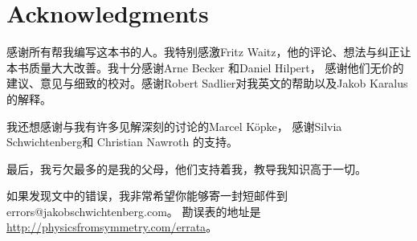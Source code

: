 
\chapter*{Acknowledgments}
感谢所有帮我编写这本书的人。我特别感激Fritz Waitz，他的评论、想法与纠正让本书质量大大改善。我十分感谢Arne Becker 和Daniel Hilpert， 感谢他们无价的建议、意见与细致的校对。感谢Robert Sadlier对我英文的帮助以及Jakob Karalus的解释。

我还想感谢与我有许多见解深刻的讨论的Marcel K\"opke， 感谢Silvia Schwichtenberg和 Christian Nawroth 的支持。

最后，我亏欠最多的是我的父母，他们支持着我，教导我知识高于一切。

如果发现文中的错误，我非常希望你能够寄一封短邮件到 errors@jakobschwichtenberg.com。 勘误表的地址是\url{http://physicsfromsymmetry.com/errata}。

